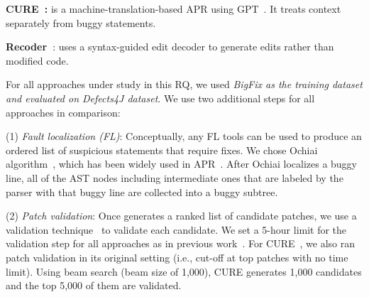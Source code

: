 


{\bf CURE~\cite{cure-icse21}:} is a machine-translation-based APR
using GPT~\cite{radford2018improving}.
It treats context separately from buggy statements.





{\bf Recoder~\cite{recoder-fse21}}: uses a syntax-guided edit decoder
to generate edits rather than modified code.


For all approaches under study in this RQ, we used {\em BigFix as the
training dataset and evaluated on Defects4J dataset}. 
We use two additional steps for all approaches in comparison:

(1) {\em Fault localization (FL)}: Conceptually, any FL
tools can be used to produce an ordered list of suspicious
statements that require fixes. We chose Ochiai
algorithm~\cite{abreu2006evaluation, pearson2017evaluating}, which has
been widely used in
APR~\cite{jiang2018shaping,xiong2017precise,koyuncu2018fixminer,xin2017leveraging,wen2018context,liu2018lsrepair}.
After Ochiai localizes a buggy line, all of the AST nodes including
intermediate ones that are labeled by the parser with that buggy line
are collected into a buggy subtree.

(2) {\em Patch validation}: Once {\tool} generates a ranked list of
candidate patches, we use a validation
technique~\cite{saha2017elixir,jiang2018shaping} to validate each
candidate.
We set a 5-hour limit for the validation step for all approaches as in
previous work~\cite{icse20,tbar-issta19}.
For CURE~\cite{cure-icse21}, we also ran patch validation in its
original setting (i.e., cut-off at top patches with no time
limit). Using beam search (beam size of 1,000), CURE generates 1,000
candidates and the top 5,000 of them are validated.

